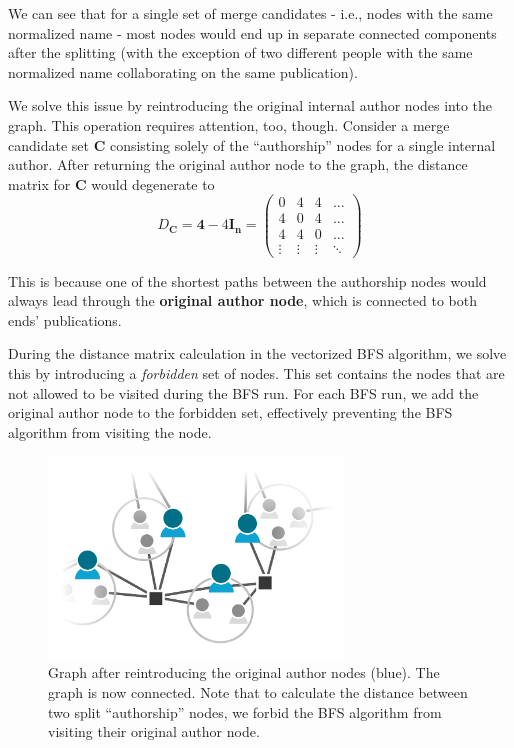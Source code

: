 We can see that for a single set of merge candidates - i.e., nodes with the same normalized name - 
most nodes would end up in separate connected components after the splitting (with the exception of two different people with the same normalized name collaborating on the same publication).

We solve this issue by reintroducing the original internal author nodes into the graph.
This operation requires attention, too, though. 
Consider a merge candidate set $\mathbf{C}$ consisting solely of the ``authorship'' nodes for a single internal author.
After returning the original author node to the graph, the distance matrix for $\mathbf{C}$ would degenerate to
$$
D_{\mathbf{C}} = \mathbf{4} - 4\mathbf{I_n} = \left( \begin{array}{cccc}
0 & 4 & 4 & \hdots \\
4 & 0 & 4 & \hdots \\
4 & 4 & 0 & \hdots \\
\vdots & \vdots & \vdots & \ddots
\end{array} \right)
$$

This is because one of the shortest paths between the authorship nodes would always lead through the \textbf{original author node},
which is connected to both ends' publications.

During the distance matrix calculation in the vectorized BFS algorithm, we solve this by introducing a \textit{forbidden}
set of nodes. This set contains the nodes that are not allowed to be visited during the BFS run.
For each BFS run, we add the original author node to the forbidden set, effectively preventing the BFS algorithm from visiting the node.

\begin{figure}[ht!]
    \captionsetup{width=.9\linewidth}
    \includegraphics[width=0.7\textwidth]{../img/merging-splitting-reintroduced.png}
    \centering
    \caption{Graph after reintroducing the original author nodes (blue). The graph is now connected. Note that to calculate the distance between two split ``authorship'' nodes, we forbid the BFS algorithm from visiting their original author node.}
\end{figure}

